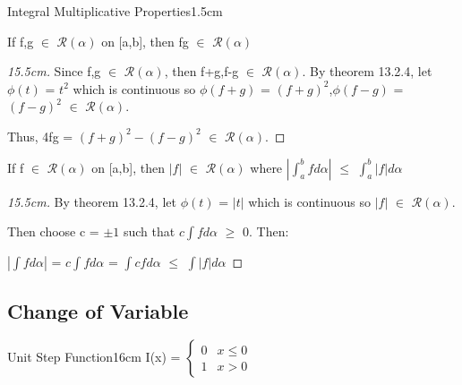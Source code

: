     \begin{ltheorem}{Integral Multiplicative Properties}{1.5cm}
        \item If f,g $\in$ $\mathscr{R}(\alpha)$ on [a,b], then
        fg $\in$ $\mathscr{R}(\alpha)$
    
            \begin{proof}[15.5cm]
                Since f,g $\in$ $\mathscr{R}(\alpha)$, then
                f+g,f-g $\in$ $\mathscr{R}(\alpha)$.
                By {\color{red} theorem 13.2.4}, let
                $\phi(t)$ = $t^2$ which is continuous so
                $\phi(f+g)$ = $(f+g)^2$,$\phi(f-g)$ = $(f-g)^2$ $\in$
                $\mathscr{R}(\alpha)$.

                Thus, 4fg = $(f+g)^2 - (f-g)^2$ $\in$ $\mathscr{R}(\alpha)$.                
            \end{proof}

        \item If f $\in$ $\mathscr{R}(\alpha)$ on [a,b], then
        $|f|$ $\in$ $\mathscr{R}(\alpha)$ where
        $|\int_a^b f d\alpha|$ $\leq$ $\int_a^b |f| d\alpha$

            \begin{proof}[15.5cm]
                By {\color{red} theorem 13.2.4}, let
                $\phi(t)$ = $|t|$ which is continuous so $|f|$ $\in$
                $\mathscr{R}(\alpha)$.

                Then choose c = $\pm 1$ such that $c \int f d\alpha$ $\geq$ 0. Then:

                \hspace{0.5cm}
                $|\int f d\alpha|$
                = $c \int f d\alpha$
                = $\int cf d\alpha$
                $\leq$ $\int |f| d\alpha$
            \end{proof}    
    \end{ltheorem}

    \vspace{0.5cm}





\subsection{ Change of Variable }

    \begin{definition}{Unit Step Function}{16cm}
        I(x) =
        $
        \begin{cases}
            0 & x \leq 0 \\
            1 & x > 0
        \end{cases}
        $
    \end{definition}

